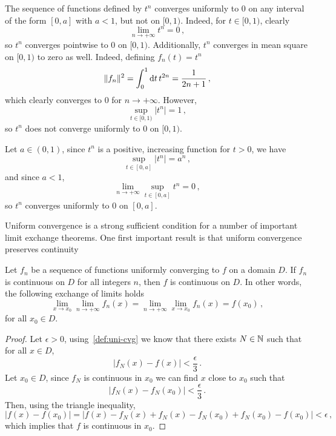 \begin{example}
  The sequence of functions defined by $t^n$ converges uniformly to $0$ on any interval of
  the form $[0,a]$ with $a<1$, but not on $[0,1)$. Indeed, for $t\in [0,1)$, clearly
  \begin{equation}
    \lim_{n\to+\infty}t^n=0\,,
  \end{equation}
  so $t^n$ converges pointwise to $0$ on $[0,1)$. Additionally, $t^n$ converges in mean square on $[0,1)$ to
  zero as well. Indeed, defining $f_n(t)=t^n$
  \begin{equation}
    \|f_n\|^2=\int_0^1\mathrm{d} t\,t^{2n}=\frac{1}{2n+1}\,,
  \end{equation}
  which clearly converges to $0$ for $n\to+\infty$. However,
  \begin{equation}
    \sup_{t\in[0,1)}|t^n|=1\,,
  \end{equation}
  so $t^n$ does not converge uniformly to $0$ on $[0,1)$.

  Let $a\in(0,1)$, since $t^n$ is a
  positive, increasing function for $t>0$, we have
  \begin{equation}
    \sup_{t\in[0,a]}|t^n|=a^n\,,
  \end{equation}
  and since $a<1$,
  \begin{equation}
    \lim_{n\to+\infty}\sup_{t\in[0,a]}t^n=0\,,
  \end{equation}
  so $t^n$ converges uniformly to $0$ on $[0,a]$.
\end{example}
Uniform convergence is a strong sufficient condition for a number of important limit
exchange theorems. One first important result is that uniform convergence preserves
continuity
\begin{theorem}
  \label{thm:uniconv-continuous}
  Let $f_n$ be a sequence of functions uniformly converging to $f$ on a domain $D$. If
  $f_n$ is continuous on $D$ for all integers $n$, then $f$ is continuous on $D$. In other
  words, the following exchange of limits holds
  \begin{equation}
    \lim_{x\to x_0}\lim_{n\to+\infty}f_n(x)=\lim_{n\to+\infty}\lim_{x\to x_0}f_n(x)=f(x_0)\,,
  \end{equation}
  for all $x_0\in D$.
\end{theorem}
\begin{proof}
  Let $\epsilon>0$, using~\cref{def:uni-cvg} we know that there exists $N\in\mathbb{N}$
  such that for all $x\in D$,
  \begin{equation}
    |f_N(x)-f(x)|<\frac{\epsilon}{3}\,.
  \end{equation}
  Let $x_0\in D$, since $f_N$ is continuous in $x_0$ we can find $x$ close to $x_0$ such
  that
  \begin{equation}
    |f_N(x)-f_N(x_0)|<\frac{\epsilon}{3}\,.
  \end{equation}
  Then, using the triangle inequality,
  \begin{equation}
    |f(x)-f(x_0)|=|f(x)-f_N(x)+f_N(x)-f_N(x_0)+f_N(x_0)-f(x_0)|<\epsilon\,,
  \end{equation}
  which implies that $f$ is continuous in $x_0$.
\end{proof}
